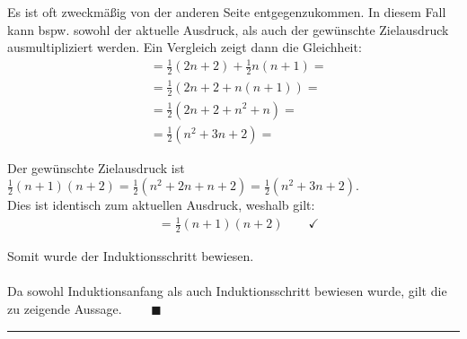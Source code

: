 \documentclass{article}
\newcommand{\lr}[1]{\left(#1\right)}
\begin{document}
{	Es ist oft zweckmäßig von der anderen Seite entgegenzukommen. In diesem Fall kann bspw. sowohl der aktuelle Ausdruck, als auch der gewünschte Zielausdruck ausmultipliziert werden. Ein Vergleich zeigt dann die Gleichheit:
		\begin{align*}
			&= \frac{1}{2} (2n+2) + \frac{1}{2}n(n+1) = \\
			&= \frac{1}{2} \lr{ 2n + 2 + n(n+1) } = \\
			&= \frac{1}{2} \lr{ 2n + 2 + n^2 + n } = \\
			&= \frac{1}{2} \lr{ n^2 + 3n + 2 } =
		\end{align*}
	
	Der gewünschte Zielausdruck ist $\frac{1}{2}(n+1)(n+2) = \frac{1}{2} (n^2 + 2n + n + 2) = \frac{1}{2} (n^2 + 3n + 2)$.\\
	Dies ist identisch zum aktuellen Ausdruck, weshalb gilt:
		\begin{align*}
			&= \frac{1}{2}(n+1)(n+2) \qquad \checkmark
		\end{align*}
	
	Somit wurde der Induktionsschritt bewiesen.\\
	\\
	Da sowohl Induktionsanfang als auch Induktionsschritt bewiesen wurde, gilt die zu zeigende Aussage. $\qquad \blacksquare$
\hrule
}


\newpage
\end{document}
